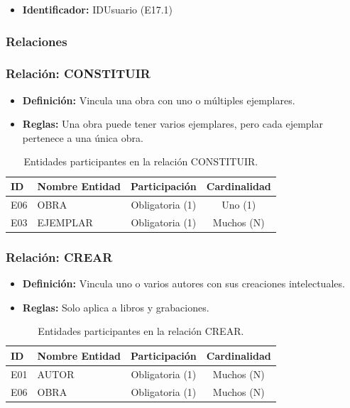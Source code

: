\begin{itemize}
	\item\textbf{Identificador:} IDUsuario (E17.1)
\end{itemize}

\subsubsection*{Relaciones}

\subsubsection{Relación: CONSTITUIR}
\begin{itemize}
	\item\textbf{Definición:} Vincula una obra con uno o múltiples ejemplares.
	\item\textbf{Reglas:} Una obra puede tener varios ejemplares, pero cada ejemplar pertenece a una única obra.
\end{itemize}

\begin{table}[H]
	\centering
	\caption{Entidades participantes en la relación CONSTITUIR.}
	\label{tab:rel_constituir}
	\small
	\begin{tabularx}{\textwidth}{X l c c}
		\toprule
		\textbf{ID} & \textbf{Nombre Entidad} & \textbf{Participación} & \textbf{Cardinalidad} \\
		\midrule
		E06 & OBRA & Obligatoria (1) & Uno (1) \\
		\addlinespace
		E03 & EJEMPLAR & Obligatoria (1) & Muchos (N) \\
		\bottomrule
	\end{tabularx}
\end{table}

\subsubsection{Relación: CREAR}
\begin{itemize}
	\item\textbf{Definición:} Vincula uno o varios autores con sus creaciones intelectuales.
	\item\textbf{Reglas:} Solo aplica a libros y grabaciones.
\end{itemize}

\begin{table}[H]
	\centering
	\caption{Entidades participantes en la relación CREAR.}
	\label{tab:rel_crear}
	\small
	\begin{tabularx}{\textwidth}{X l c c}
		\toprule
		\textbf{ID} & \textbf{Nombre Entidad} & \textbf{Participación} & \textbf{Cardinalidad} \\
		\midrule
		E01 & AUTOR & Obligatoria (1) & Muchos (N) \\
		\addlinespace
		E06 & OBRA & Obligatoria (1) & Muchos (N) \\
		\bottomrule
	\end{tabularx}
\end{table}

